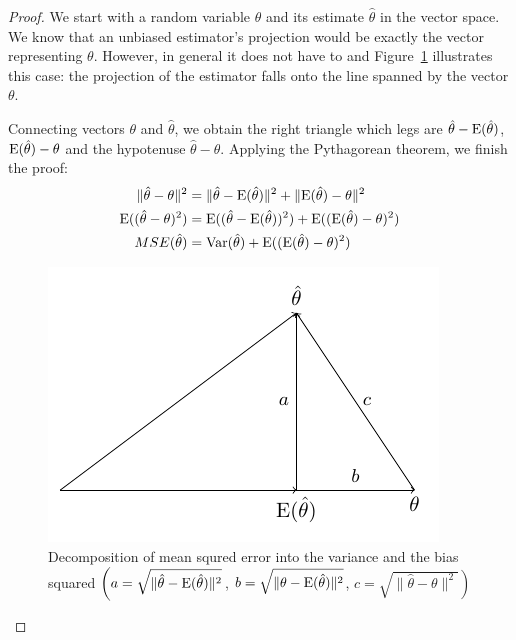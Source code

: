 \begin{proof}
We start with a random variable $\theta$ and its estimate $\hat \theta$ in the
vector space. We know that an unbiased estimator's projection would be exactly
the vector representing $\theta$. However, in general it does not have to and
Figure~\ref{fig:mse_decomposed} illustrates this case: the projection of the estimator falls onto
the line spanned by the vector $\theta$.

Connecting vectors $\theta$ and $\hat \theta$, we obtain the right triangle which
legs are $\hat \theta - \operatorname{E}(\hat\theta)$, $\operatorname{E}(\hat\theta) - \theta$ and the
hypotenuse $\hat \theta - \theta$.
Applying the Pythagorean theorem, we finish the proof:
\begin{align*}
\lVert \hat \theta - \theta \rVert^2 &= \lVert \hat \theta - \operatorname{E}(\hat \theta) \rVert^2  + \lVert \operatorname{E}(\hat \theta) - \theta \rVert^2 \\
\operatorname{E}((\hat \theta - \theta)^2) &= \operatorname{E}((\hat \theta - \operatorname{E}(\hat \theta))^2) + \operatorname{E}((\operatorname{E}(\hat \theta) - \theta)^2) \\
MSE(\hat \theta) &= \operatorname{Var}(\hat \theta) + \operatorname{E}((\operatorname{E}(\hat \theta) - \theta)^2)
\end{align*}

\begin{figure}[h!]
\begin{center}
\includegraphics[width=0.6\linewidth]{figures/01_mse_decomposition.pdf}
\caption{Decomposition of mean squred error into the variance and the bias squared
$\left(a = \sqrt{\lVert\hat\theta - \operatorname{E}(\hat\theta)\rVert^2} \right.$, $b = \sqrt{\lVert \theta - \operatorname{E}(\hat\theta) \rVert^2}$, $\left. c = \sqrt{\lVert \hat\theta - \theta \rVert^2} \right)$}
\label{fig:mse_decomposed}
\end{center}
\end{figure}

\end{proof}
